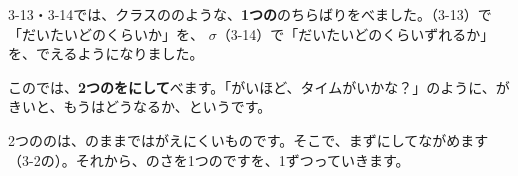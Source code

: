 3-13・3-14では、クラスののような、\textbf{1つの}のちらばりをべました。（3-13）で「だいたいどのくらいか」を、 $\sigma$（3-14）で「だいたいどのくらいずれるか」を、でえるようになりました。

このでは、\textbf{2つのをにして}べます。「がいほど、タイムがいかな？」のように、がきいと、もうはどうなるか、というです。

2つののは、のままではがえにくいものです。そこで、まずにしてながめます（3-2の）。それから、のさを1つのですを、1ずつっていきます。

